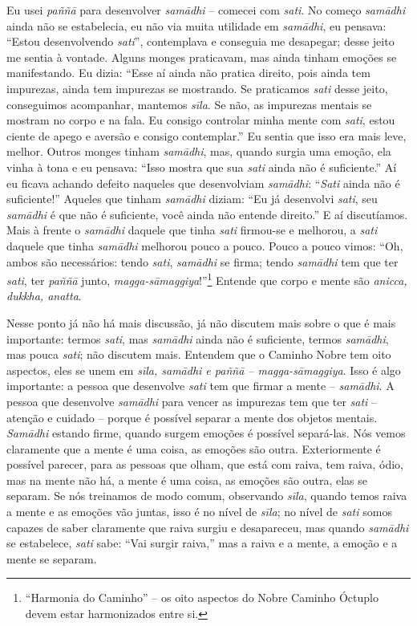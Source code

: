 Eu usei \textit{paññā} para desenvolver \textit{samādhi} –
comecei com \textit{sati}. No começo \textit{samādhi} ainda não se
estabelecia, eu não via muita utilidade em \textit{samādhi}, eu
pensava: “Estou desenvolvendo \textit{sati}”, contemplava e conseguia
me desapegar; desse jeito me sentia à vontade. Alguns monges
praticavam, mas ainda tinham emoções se manifestando. Eu dizia: “Esse
aí ainda não pratica direito, pois ainda tem impurezas, ainda tem
impurezas se mostrando. Se praticamos \textit{sati} desse jeito,
conseguimos acompanhar, mantemos \textit{sīla}. Se não, as impurezas
mentais se mostram no corpo e na fala. Eu consigo controlar minha mente
com \textit{sati}, estou ciente de apego e aversão e consigo
contemplar.” Eu sentia que isso era mais leve, melhor. Outros monges
tinham \textit{samādhi}, mas, quando surgia uma emoção, ela vinha à
tona e eu pensava: “Isso mostra que sua \textit{sati} ainda não é
suficiente.” Aí eu ficava achando defeito naqueles que desenvolviam
\textit{samādhi}: “\textit{Sati} ainda não é suficiente!” Aqueles que
tinham \textit{samādhi} diziam: “Eu já desenvolvi \textit{sati}, seu
\textit{samādhi} é que não é suficiente, você ainda não entende
direito.” E aí discutíamos. Mais à frente o \textit{samādhi} daquele
que tinha \textit{sati} firmou-se e melhorou, a \textit{sati} daquele
que tinha \textit{samādhi} melhorou pouco a pouco. Pouco a pouco
vimos: “Oh, ambos são necessários: tendo \textit{sati},
\textit{samādhi} se firma; tendo \textit{samādhi} tem que ter
\textit{sati}, ter \textit{paññā} junto,
\textit{magga-sāmaggiya}!”\footnote{“Harmonia do Caminho” -- os oito
aspectos do Nobre Caminho Óctuplo devem estar harmonizados entre si.}
Entende que corpo e mente são \textit{anicca, dukkha, anatta}. 

Nesse ponto já não há mais discussão, já não discutem mais sobre o
que é mais importante: termos \textit{sati}, mas \textit{samādhi}
ainda não é suficiente, termos \textit{samādhi}, mas pouca
\textit{sati}; não discutem mais. Entendem que o Caminho Nobre tem oito
aspectos, eles se unem em \textit{sīla, samādhi e paññā –
magga-sāmaggiya}. Isso é algo importante: a pessoa que desenvolve
\textit{sati} tem que firmar a mente – \textit{samādhi}. A pessoa que
desenvolve \textit{samādhi} para vencer as impurezas tem que ter
\textit{sati} – atenção e cuidado – porque é possível separar a mente
dos objetos mentais. \textit{Samādhi} estando firme, quando surgem
emoções é possível separá-las. Nós vemos claramente que a mente é uma
coisa, as emoções são outra. Exteriormente é possível parecer, para as
pessoas que olham, que está com raiva, tem raiva, ódio, mas na mente
não há, a mente é uma coisa, as emoções são outra, elas se separam. Se
nós treinamos de modo comum, observando \textit{sīla}, quando temos
raiva a mente e as emoções vão juntas, isso é no nível de
\textit{sīla}; no nível de \textit{sati} somos capazes de saber
claramente que raiva surgiu e desapareceu, mas quando
\textit{samādhi} se estabelece, \textit{sati} sabe: “Vai surgir
raiva,” mas a raiva e a mente, a emoção e a mente se separam. 

